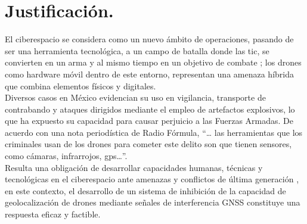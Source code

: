 \chapter*{Justificación.}

\begin{justify}
    El ciberespacio se considera como un nuevo ámbito de operaciones, pasando de ser una herramienta tecnológica,
    a un campo de batalla donde las \gls{tic}, se convierten en un arma y
    al mismo tiempo en un objetivo de combate \parencite{defensa2022manual}; los drones como hardware móvil dentro de este entorno,
    representan una amenaza híbrida que combina elementos físicos y digitales.\\

    \noindent Diversos casos en México evidencian su uso en vigilancia, transporte de contrabando y ataques dirigidos mediante
    el empleo de artefactos explosivos, lo que ha expuesto su capacidad para causar perjuicio a las Fuerzas Armadas.
    De acuerdo con una nota periodística de Radio Fórmula, “… las herramientas que los criminales usan de los drones
    para cometer este delito son que tienen sensores, como cámaras, infrarrojos, \gls{gps}…”.\\

    \noindent Resulta una obligación de desarrollar capacidades humanas, técnicas y tecnológicas en el
    ciberespacio ante amenazas y conflictos de última generación \parencite{defensa2022manual}, en este contexto,
    el desarrollo de un sistema de inhibición de la capacidad de geolocalización de drones mediante señales de
    interferencia GNSS constituye una respuesta eficaz y factible.
\end{justify}